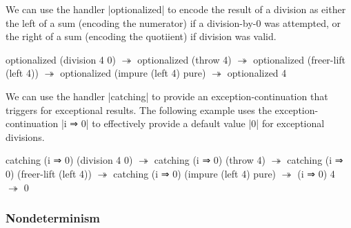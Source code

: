 We can use the handler \code|optionalized| to encode the result of a division as either
the left of a sum (encoding the numerator) if a division-by-0 was attempted, or
the right of a sum (encoding the quotiient) if division was valid.
\begin{snippet}[caption={Handling \code|division| with \code|optionalized|}]
optionalized (division 4 0)
$↠$
optionalized (throw 4)
$↠$
optionalized (freer-lift (left 4))
$↠$
optionalized (impure (left 4) pure)
$↠$
optionalized 4
\end{snippet}

We can use the handler \code|catching| to provide an exception-continuation that triggers for exceptional results.
The following example uses the exception-continuation \code|i ⇒ 0| to effectively provide a default value \code|0| for exceptional divisions.
\begin{snippet}[caption={Handling \code|division| with \code|catching|}]
catching (i ⇒ 0) (division 4 0)
$↠$
catching (i ⇒ 0) (throw 4)
$↠$
catching (i ⇒ 0) (freer-lift (left 4))
$↠$
catching (i ⇒ 0) (impure (left 4) pure)
$↠$
(i ⇒ 0) 4
$↠$
0
\end{snippet}

\subsubsection{Nondeterminism}

